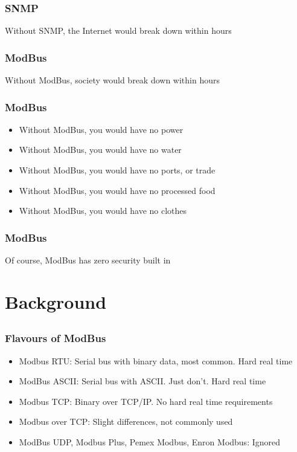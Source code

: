 \documentclass[aspectratio=169]{beamer}
\begin{document}
\begin{frame}
	\frametitle{SNMP}
	\centering
	\vfill
	Without SNMP, the Internet would break down within hours
	\vfill
\end{frame}

\begin{frame}
	\frametitle{ModBus}
	\centering
	\vfill
	Without ModBus, society would break down within hours
	\vfill
\end{frame}

\begin{frame}
	\frametitle{ModBus}
	\begin{itemize}
		\item Without ModBus, you would have no power
		\item Without ModBus, you would have no water
		\item Without ModBus, you would have no ports, or trade
		\item Without ModBus, you would have no processed food
		\item Without ModBus, you would have no clothes
	\end{itemize}
\end{frame}

\begin{frame}
	\frametitle{ModBus}
	\centering
	\vfill
	Of course, ModBus has zero security built in
	\vfill
\end{frame}



\section{Background}


\subsection{}

\begin{frame}
	\frametitle{Flavours of ModBus}
	\begin{itemize}
		\item Modbus RTU: Serial bus with binary data, most common. Hard real time
		\item ModBus ASCII: Serial bus with ASCII. Just don't. Hard real time
		\item Modbus TCP: Binary over TCP/IP. No hard real time requirements
		\item Modbus over TCP: Slight differences, not commonly used
		\item ModBus UDP, Modbus Plus, Pemex Modbus, Enron Modbus: Ignored
	\end{itemize}
\end{frame}
\end{document}

